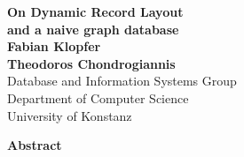 \begin{titlepage}
\thispagestyle{plain}
   \begin{center}
       \vspace*{1cm}
        \Huge
        \textbf{On Dynamic Record Layout} \\ [0.5em]
        \Large
       \textbf{and a naive graph database} \\
       \vspace*{2cm}
       \normalsize
       \textbf{Fabian Klopfer \\
       Theodoros Chondrogiannis} \\ \vspace*{0.5cm}
       Database and Information Systems Group \\
       Department of Computer Science \\
       University of Konstanz\\
       
        
        \vspace*{1cm}
        
        \textbf{Abstract}
        
   \end{center}
\end{titlepage}

\newpage
\tableofcontents
